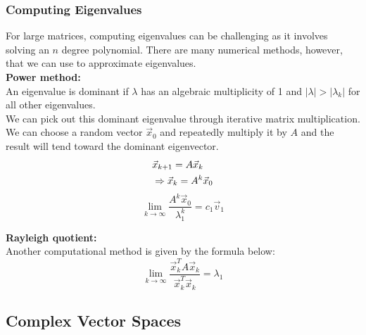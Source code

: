 \documentclass[11pt, fleqn]{article}
\begin{document}
\subsubsection{Computing Eigenvalues}
For large matrices, computing eigenvalues can be challenging as it involves solving an $n$ degree polynomial. There are many numerical methods, however, that we can use to approximate eigenvalues.\\

\textbf{Power method:}\\
An eigenvalue is dominant if $\lambda$ has an algebraic multiplicity of 1 and $|\lambda|>|\lambda_k|$ for all other eigenvalues.\\
We can pick out this dominant eigenvalue through iterative matrix multiplication.\\
We can choose a random vector $\vec{x}_0$ and repeatedly multiply it by $A$ and the result will tend toward the dominant eigenvector.
\begin{align*}
    &\vec{x}_{k+1}=A\vec{x}_k\\
    &\Rightarrow \vec{x}_k=A^k\vec{x}_0
\end{align*}
$$\lim_{k\to\infty}\frac{A^k\vec{x}_0}{\lambda_1^k}=c_1\vec{v}_1$$

\textbf{Rayleigh quotient:}\\
Another computational method is given by the formula below:
$$\lim_{k\to\infty}\frac{\vec{x}_k^TA\vec{x}_k}{\vec{x}_k^T\vec{x}_k}=\lambda_1$$





















\subsection{Complex Vector Spaces}
\end{document}
